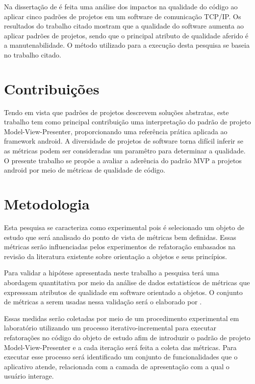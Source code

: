 Na dissertação de  é feita uma análise dos impactos na
qualidade do código  ao aplicar cinco padrões de projetos em um software de comunicação
TCP/IP. Os resultados do trabalho citado mostram que a qualidade do software
aumenta ao aplicar padrões de projetos, sendo que o principal atributo de
qualidade aferido é a manutenabilidade. O método utilizado para a execução desta
pesquisa se baseia no trabalho citado. 

\section{Contribuições}


Tendo em vista que padrões de projetos descrevem soluções abstratas, este
trabalho tem como principal contribuição uma interpretação do padrão de projeto
Model-View-Presenter, proporcionando uma referência prática aplicada ao
framework android. A diversidade de projetos de software torna difícil inferir
se as métricas podem ser consideradas um paramêtro para determinar a qualidade.
O presente trabalho se propõe a avaliar a aderência do padrão MVP a projetos
android por meio de métricas de qualidade de código.

\section{Metodologia}

Esta pesquisa se caracteriza como experimental pois é selecionado um objeto
de estudo que será analisado do ponto de vista de métricas bem definidas. Essas
métricas serão influenciadas pelos experimentos de refatoração embasados na
revisão da literatura existente sobre orientação a objetos e seus princípios.

Para validar a hipótese apresentada neste trabalho a pesquisa terá uma
abordagem quantitativa por meio da análise de dados estatistícos de métricas 
que expresssam atributos de qualidade em software orientado a objetos. O
conjunto de métricas a serem usadas nessa validação será o elaborado por
.

Essas medidas serão coletadas por meio de um procedimento experimental em
laboratório utilizando um processo iterativo-incremental para executar
refatorações no código do objeto de estudo afim de introduzir o padrão de
projeto Model-View-Presenter e a cada iteração será feita a coleta das
métricas. Para executar esse processo será identificado um conjunto de
funcionalidades que o aplicativo atende, relacionada com a camada de
apresentação com a qual o usuário interage.

